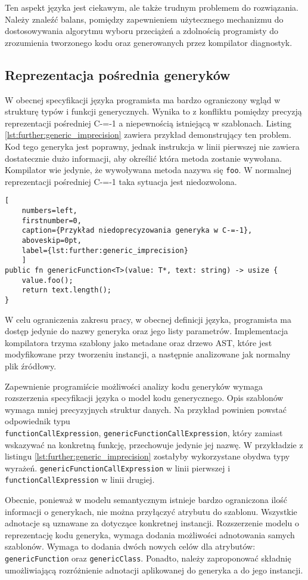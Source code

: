 Ten aspekt języka jest ciekawym, ale także trudnym problemem do rozwiązania.
Należy znaleźć balans, pomiędzy zapewnieniem użytecznego mechanizmu do dostosowywania algorytmu wyboru przeciążeń a zdolnością programisty do zrozumienia tworzonego kodu oraz generowanych przez kompilator diagnostyk.

\subsection{Reprezentacja pośrednia generyków}
\label{further:generic_intermidiate_representation}

W obecnej specyfikacji języka programista ma bardzo ograniczony wgląd w strukturę typów i funkcji generycznych.
Wynika to z konfliktu pomiędzy precyzją reprezentacji pośredniej C-=-1 a niepewnością istniejącą w szablonach.
Listing \ref{lst:further:generic_imprecision} zawiera przykład demonstrujący ten problem.
Kod tego generyka jest poprawny, jednak instrukcja w linii pierwszej nie zawiera dostatecznie dużo informacji, aby określić która metoda zostanie wywołana.
Kompilator wie jedynie, że wywoływana metoda nazywa się \lstinline{foo}.
W normalnej reprezentacji pośredniej C-=-1 taka sytuacja jest niedozwolona.
\begin{lstlisting}[
	numbers=left,
	firstnumber=0,
	caption={Przykład niedoprecyzowania generyka w C-=-1},
	aboveskip=0pt,
	label={lst:further:generic_imprecision}
	]
public fn genericFunction<T>(value: T*, text: string) -> usize {
	value.foo();
	return text.length();
}

\end{lstlisting}

W celu ograniczenia zakresu pracy, w obecnej definicji języka, programista ma dostęp jedynie do nazwy generyka oraz jego listy parametrów.
Implementacja kompilatora trzyma szablony jako metadane oraz drzewo AST, które jest modyfikowane przy tworzeniu instancji, a następnie analizowane jak normalny plik źródłowy.

Zapewnienie programiście możliwości analizy kodu generyków wymaga rozszerzenia specyfikacji języka o model kodu generycznego.
Opis szablonów wymaga mniej precyzyjnych struktur danych.
Na przykład powinien powstać odpowiednik typu \\\lstinline{functionCallExpression}, \lstinline{genericFunctionCallExpression}, który zamiast wskazywać na konkretną funkcję, przechowuje jedynie jej nazwę.
W przykładzie z listingu \ref{lst:further:generic_imprecision} zostałyby wykorzystane obydwa typy wyrażeń.
\lstinline{genericFunctionCallExpression} w linii pierwszej i \lstinline{functionCallExpression} w linii drugiej.

Obecnie, ponieważ w modelu semantycznym istnieje bardzo ograniczona ilość informacji o generykach, nie można przyłączyć atrybutu do szablonu.
Wszystkie adnotacje są uznawane za dotyczące konkretnej instancji.
Rozszerzenie modelu o reprezentację kodu generyka, wymaga dodania możliwości adnotowania samych szablonów.
Wymaga to dodania dwóch nowych celów dla atrybutów: \lstinline{genericFunction} oraz \lstinline{genericClass}.
Ponadto, należy zaproponować składnię umożliwiającą rozróżnienie adnotacji aplikowanej do generyka a do jego instancji.
